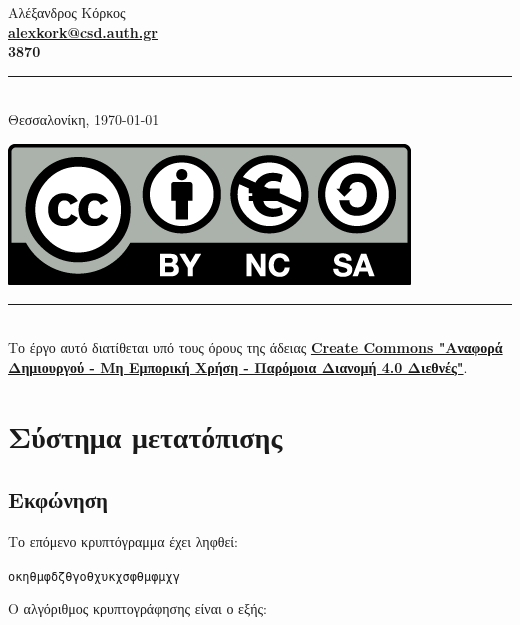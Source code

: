 \documentclass[oneside]{article}
\let\t\texttt
\newcommand{\Rule}{\rule{\linewidth}{0.5mm}}
\begin{document}
\begin{titlepage}
    \vspace*{\fill}
    
    \begin{center}
        Αλέξανδρος Κόρκος \\
        \textbf{\href{mailto:alexkork@csd.auth.gr}{alexkork@csd.auth.gr}}\\
        \textbf{3870}
        \Rule \\[0.4cm]
        Θεσσαλονίκη, \today
    \end{center}
    
\end{titlepage}

\vspace*{\fill}

\begin{center}
    \href{https://creativecommons.org/licenses/by-nc-sa/4.0/deed.el}{\includegraphics[scale=0.2]{Images/cc.png}} \\
    \Rule \\[0.4cm]
    Το έργο αυτό διατίθεται υπό τους όρους της άδειας \textbf{\href{https://creativecommons.org/licenses/by-nc-sa/4.0/deed.el}{Create Commons "Αναφορά Δημιουργού - Μη Εμπορική Χρήση - Παρόμοια Διανομή 4.0 Διεθνές"}}. \\ 
\end{center}

\newpage

\tableofcontents

\newpage

\section{Σύστημα μετατόπισης}

\subsection{Εκφώνηση} 

Το επόμενο κρυπτόγραμμα έχει ληφθεί:

\begin{center}
    \t{οκηθμφδζθγοθχυκχσφθμφμχγ}
\end{center}
Ο αλγόριθμος κρυπτογράφησης είναι ο εξής: 
\end{document}
